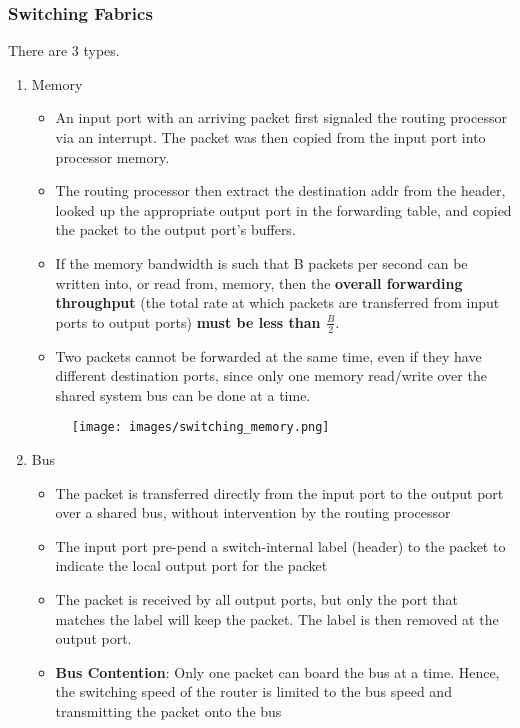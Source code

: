 \documentclass[a4paper]{article}
\begin{document}
\subsubsection{Switching Fabrics}
There are 3 types.
\begin{enumerate}
    \item Memory
    \begin{itemize}[label=$\circ$]
        \item An input port with an arriving packet first signaled the routing processor via an interrupt. The packet was then copied from the input port into processor memory.
        \item The routing processor then extract the destination addr from the header, looked up the appropriate output port in the forwarding table, and copied the packet to the output port’s buffers.
        \item If the memory bandwidth is such that B packets per second can be written into, or read from, memory, then the \textbf{overall forwarding throughput} (the total rate at which packets are transferred from input ports to output ports) \textbf{must be less than $\displaystyle\frac{B}{2}$}.
        \item Two packets cannot be forwarded at the same time, even if they have different destination ports, since only one memory read/write over the shared system bus can be done at a time.
    \end{itemize}
    \begin{figure}[H]
        \centering
        \texttt{[image: images/switching\_memory.png]}
    \end{figure}
    \item Bus
    \begin{itemize}
        \item The packet is transferred directly from the input port to the output port over a shared bus, without intervention by the routing processor
        \item The input port pre-pend a switch-internal label (header) to the packet to indicate the local output port for the packet
        \item The packet is received by all output ports, but only the port that matches the label will keep the packet. The label is then removed at the output port.
        \item \textbf{Bus Contention}: Only one packet can board the bus at a time. Hence, the switching speed of the router is limited to the bus speed and transmitting the packet onto the bus 

\end{itemize}
\end{enumerate}
\end{document}
